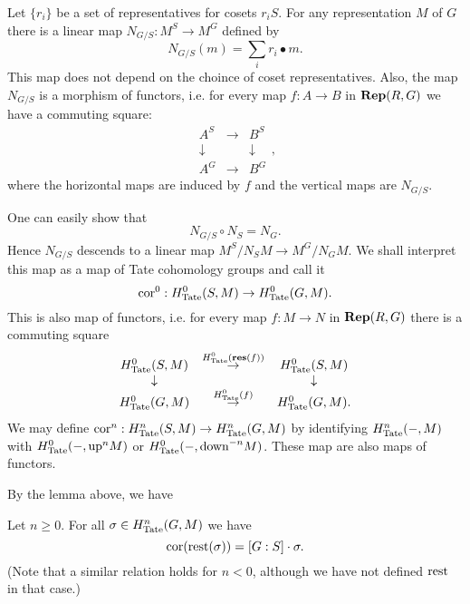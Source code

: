 \begin{definition} \label{def:corestriction}
	Let $\{r_i\}$ be a set of representatives for cosets $r_i S$.
	For any representation $M$ of $G$ there is a linear map $N_{G/S} : M^S \to M^G$
	defined by
	\[
		N_{G/S}(m) = \sum_i r_i \bullet m.
	\]
	This map does not depend on the choince of coset representatives.
	Also, the map $N_{G/S}$ is a morphism of functors, i.e. for every map $f : A \to B$ in
	$\mathbf{Rep}(R,G)$ we have a commuting square:
	\[
		\begin{matrix}
			A^S & \to & B^S \\
			\downarrow && \downarrow \\
			A^G & \to & B^G
		\end{matrix},
	\]
	where the horizontal maps are induced by $f$ and the vertical maps are $N_{G/S}$.

	One can easily show that
	\[
		N_{G/S} \circ N_S = N_G.
	\]
	Hence $N_{G/S}$ descends to a linear map $M^S / N_S M \to M^G / N_G M$.
	We shall interpret this map as a map of Tate cohomology groups and call it
	\[
		\mathrm{cor}^0 : H^0_{\mathrm{Tate}}(S,M) \to H^0_{\mathrm{Tate}} (G,M).
	\]
	This is also map of functors, i.e. for every map $f : M \to N$ in $\mathbf{Rep}(R,G)$
	there is a commuting square
	\[
		\begin{matrix}
			H^0_{\mathrm{Tate}}(S,M) & \stackrel{H^0_{\mathrm{Tate}}(\mathbf{res}(f))}\to & H^0_{\mathrm{Tate}}(S,M) \\
			\downarrow && \downarrow \\
			H^0_{\mathrm{Tate}}(G,M) & \stackrel{H^0_{\mathrm{Tate}}(f)}\to & H^0_{\mathrm{Tate}}(G,M).
		\end{matrix}
	\]
	We may define $\mathrm{cor}^n : H^n_{\mathrm{Tate}}(S,M) \to H^n_{\mathrm{Tate}}(G,M)$ by
	identifying $H^n_{\mathrm{Tate}}(-,M)$ with $H^0_{\mathrm{Tate}}(-,\mathrm{up}^n M)$ or $H^0_{\mathrm{Tate}}(-,\mathrm{down}^{-n} M)$.
	These map are also maps of functors.
\end{definition}

By the lemma above, we have

\begin{lemma} \label{lem:cor comp rest}
	Let $n \ge 0$.
	For all $\sigma \in H^n_{\mathrm{Tate}}(G,M)$ we have
	\[
		\mathrm{cor}(\mathrm{rest}(\sigma)) = [G:S] \cdot \sigma.
	\]
	(Note that a similar relation holds for $n < 0$,
	although we have not defined $\mathrm{rest}$ in that case.)
\end{lemma}

